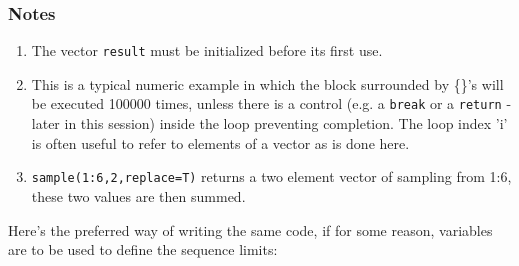 \documentclass[titlepage]{book}\usepackage{knitr}
\begin{document}
\subsubsection{Notes}
\begin{enumerate}
\item{The vector \texttt{result} must be initialized before its first use.}
\item{This is a typical numeric example in which the block surrounded by \{\}'s will be executed 100000 times, unless there is a control (e.g. a \texttt{break} or a \texttt{return} - later in this session) inside the loop preventing completion. The loop index 'i' is often useful to refer to elements of a vector as is done here.}
\item{ \texttt{sample(1:6,2,replace=T)} returns a two element vector of sampling from 1:6, these two values are then summed.}
\end{enumerate}

Here's the preferred way of writing the same code, if for some reason, variables are to be used to define the sequence limits:

\begin{knitrout}
\color{fgcolor}\begin{kframe}
\begin{alltt}
 \hlkwb{<-} 
 \hlkwb{<-} \hlstd{()}
 \hlkwb{<-}                                                               
   \hlstd{(}\hlopt{:}           
   \hlkwb{<-} \hlstd{(}\hlstd{(}\hlopt{:}\hlstd{,}\hlstd{,}                                       
\hlstd{\}}
 \hlkwb{=} \hlstd{()}\hlopt{-}
 \hlkwb{<-} \hlstd{(} 
 \hlopt{+} \hlstd{(}\hlstd{(}   \hlstd{=} \hlstd{,}  \hlstd{=} \hlstd{)}
\end{alltt}
\end{kframe}
\end{knitrout}
\end{document}
